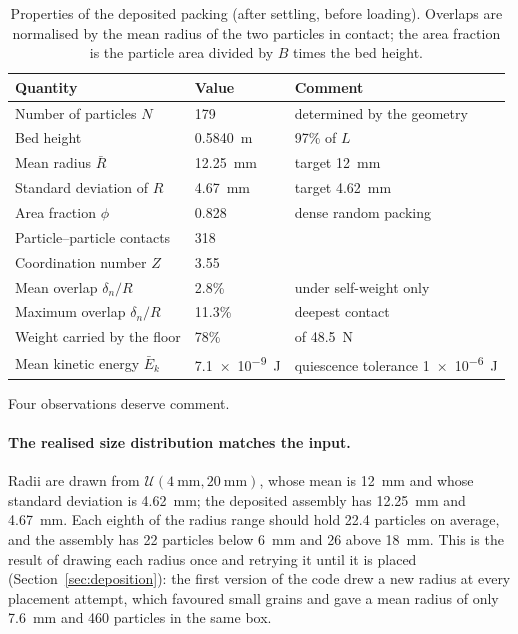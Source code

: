 \begin{table}[htbp]
  \centering
  \caption{Properties of the deposited packing (after settling, before
  loading).  Overlaps are normalised by the mean radius of the two particles in
  contact; the area fraction is the particle area divided by $B$ times the bed
  height.}
  \label{tab:packing}
  \begin{tabular}{lll}
    \toprule
    Quantity & Value & Comment \\
    \midrule
    Number of particles $N$          & 179 & determined by the geometry \\
    Bed height                       & \qty{0.5840}{\metre} & \num{97}\% of $L$ \\
    Mean radius $\bar{R}$            & \qty{12.25}{\milli\metre} & target \qty{12}{\milli\metre} \\
    Standard deviation of $R$        & \qty{4.67}{\milli\metre} & target \qty{4.62}{\milli\metre} \\
    Area fraction $\phi$             & 0.828 & dense random packing \\
    Particle--particle contacts      & 318  & \\
    Coordination number $Z$          & 3.55 & \\
    Mean overlap $\delta_{n}/R$      & \num{2.8}\% & under self-weight only \\
    Maximum overlap $\delta_{n}/R$   & \num{11.3}\% & deepest contact \\
    Weight carried by the floor      & \num{78}\% & of \qty{48.5}{\newton} \\
    Mean kinetic energy $\bar{E}_{k}$& \qty{7.1e-9}{\joule} & quiescence
                                       tolerance \qty{1e-6}{\joule} \\
    \bottomrule
  \end{tabular}
\end{table}

Four observations deserve comment.

\paragraph{The realised size distribution matches the input.}  Radii are drawn
from $\mathcal{U}(\qty{4}{\milli\metre},\qty{20}{\milli\metre})$, whose mean is
\qty{12}{\milli\metre} and whose standard deviation is
\qty{4.62}{\milli\metre}; the deposited assembly has \qty{12.25}{\milli\metre}
and \qty{4.67}{\milli\metre}.  Each eighth of the radius range should hold
\num{22.4} particles on average, and the assembly has \num{22} particles below
\qty{6}{\milli\metre} and \num{26} above \qty{18}{\milli\metre}.  This is the
result of drawing each radius once and retrying it until it is placed
(Section~\ref{sec:deposition}): the first version of the code drew a new radius
at every placement attempt, which favoured small grains and gave a mean radius
of only \qty{7.6}{\milli\metre} and \num{460} particles in the same box.

